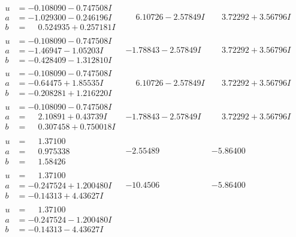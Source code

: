 \documentclass[1p]{elsarticle_modified}
\theoremstyle{definition}
\begin{document}
$$\begin{array}{c|c|c}
\begin{aligned}
u &= -0.108090 - 0.747508 I \\
a &= -1.029300 - 0.246196 I \\
b &= \phantom{-}0.524935 + 0.257181 I\end{aligned}
 & \phantom{-}6.10726 - 2.57849 I & \phantom{-}3.72292 + 3.56796 I \\ \hline\begin{aligned}
u &= -0.108090 - 0.747508 I \\
a &= -1.46947 - 1.05203 I \\
b &= -0.428409 - 1.312810 I\end{aligned}
 & -1.78843 - 2.57849 I & \phantom{-}3.72292 + 3.56796 I \\ \hline\begin{aligned}
u &= -0.108090 - 0.747508 I \\
a &= -0.64475 + 1.85535 I \\
b &= -0.208281 + 1.216220 I\end{aligned}
 & \phantom{-}6.10726 - 2.57849 I & \phantom{-}3.72292 + 3.56796 I \\ \hline\begin{aligned}
u &= -0.108090 - 0.747508 I \\
a &= \phantom{-}2.10891 + 0.43739 I \\
b &= \phantom{-}0.307458 + 0.750018 I\end{aligned}
 & -1.78843 - 2.57849 I & \phantom{-}3.72292 + 3.56796 I \\ \hline\begin{aligned}
u &= \phantom{-}1.37100\phantom{ +0.000000I} \\
a &= \phantom{-}0.975338\phantom{ +0.000000I} \\
b &= \phantom{-}1.58426\phantom{ +0.000000I}\end{aligned}
 & -2.55489\phantom{ +0.000000I} & -5.86400\phantom{ +0.000000I} \\ \hline\begin{aligned}
u &= \phantom{-}1.37100\phantom{ +0.000000I} \\
a &= -0.247524 + 1.200480 I \\
b &= -0.14313 + 4.43627 I\end{aligned}
 & -10.4506\phantom{ +0.000000I} & -5.86400\phantom{ +0.000000I} \\ \hline\begin{aligned}
u &= \phantom{-}1.37100\phantom{ +0.000000I} \\
a &= -0.247524 - 1.200480 I \\
b &= -0.14313 - 4.43627 I\end{aligned}

\end{array}$$
\end{document}

